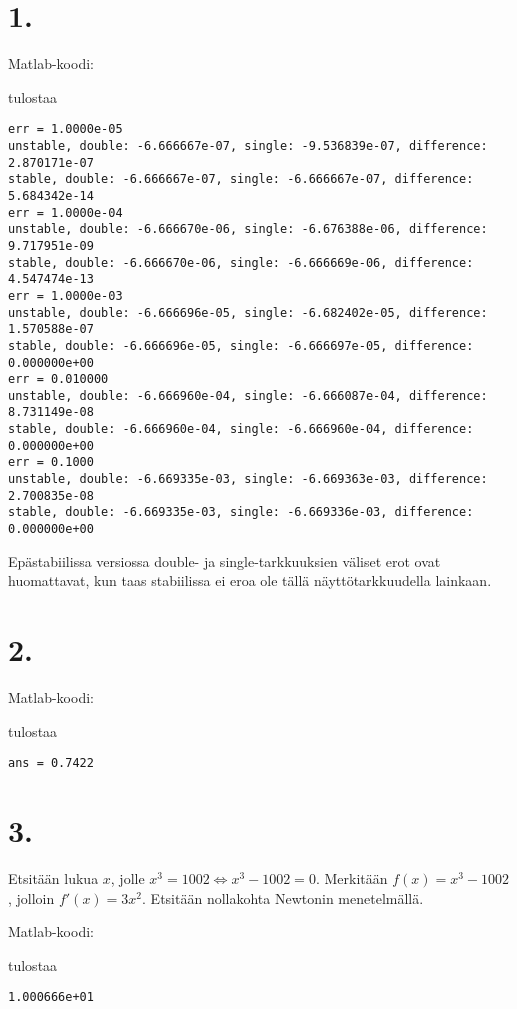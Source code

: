 \documentclass{article}
\title{}
\author{Mikael Myyrä}
\date{}
\begin{document}
\section*{1.}

Matlab-koodi:



tulostaa

\begin{verbatim}
err = 1.0000e-05
unstable, double: -6.666667e-07, single: -9.536839e-07, difference: 2.870171e-07
stable, double: -6.666667e-07, single: -6.666667e-07, difference: 5.684342e-14
err = 1.0000e-04
unstable, double: -6.666670e-06, single: -6.676388e-06, difference: 9.717951e-09
stable, double: -6.666670e-06, single: -6.666669e-06, difference: 4.547474e-13
err = 1.0000e-03
unstable, double: -6.666696e-05, single: -6.682402e-05, difference: 1.570588e-07
stable, double: -6.666696e-05, single: -6.666697e-05, difference: 0.000000e+00
err = 0.010000
unstable, double: -6.666960e-04, single: -6.666087e-04, difference: 8.731149e-08
stable, double: -6.666960e-04, single: -6.666960e-04, difference: 0.000000e+00
err = 0.1000
unstable, double: -6.669335e-03, single: -6.669363e-03, difference: 2.700835e-08
stable, double: -6.669335e-03, single: -6.669336e-03, difference: 0.000000e+00
\end{verbatim}

Epästabiilissa versiossa double- ja single-tarkkuuksien väliset erot ovat
huomattavat, kun taas stabii\-lissa ei eroa ole tällä näyttötarkkuudella lainkaan.


\newpage
\section*{2.}

Matlab-koodi:



tulostaa

\begin{verbatim}
ans = 0.7422
\end{verbatim}


\newpage
\section*{3.}

Etsitään lukua $x$, jolle $x^3 = 1002 \iff x^3 - 1002 = 0$.
Merkitään $f(x) = x^3 - 1002$, jolloin $f'(x) = 3x^2$.
Etsitään nollakohta Newtonin menetelmällä.

Matlab-koodi:



tulostaa

\begin{verbatim}
1.000666e+01
\end{verbatim}
\end{document}
